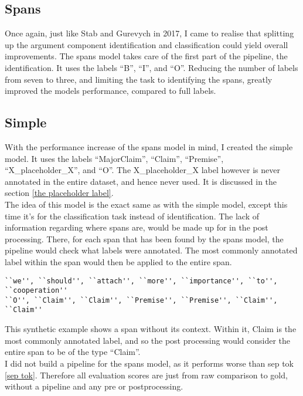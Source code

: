 \documentclass[12]{article}
\theoremstyle{mytheoremstyle}
\theoremstyle{mytheoremstyle}
\theoremstyle{myproblemstyle}
\begin{document}
  \subsection{Spans} \label{spans}
  Once again, just like Stab and Gurevych in 2017, I came to realise that splitting up the argument component identification and classification could yield overall improvements. The spans model takes care of the first part of the pipeline, the identification. It uses the labels ``B'', ``I'', and ``O''. Reducing the number of labels from seven to three, and limiting the task to identifying the spans, greatly improved the models performance, compared to full labels.
  \subsection{Simple} \label{simple}
  With the performance increase of the spans model in mind, I created the simple model. It uses the labels ``MajorClaim'', ``Claim'', ``Premise'', ``X\_placeholder\_X'', and ``O''. The X\_placeholder\_X label however is never annotated in the entire dataset, and hence never used. It is discussed in the section \ref{the placeholder label}.\\
 The idea of this model is the exact same as with the simple model, except this time it's for the classification task instead of identification. The lack of information regarding where spans are, would be made up for in the post processing. There, for each span that has been found by the spans model, the pipeline would check what labels were annotated. The most commonly annotated label within the span would then be applied to the entire span.  
  \begin{verbatim}
``we'', ``should'', ``attach'', ``more'', ``importance'', ``to'', ``cooperation''
``O'', ``Claim'', ``Claim'', ``Premise'', ``Premise'', ``Claim'', ``Claim''
  \end{verbatim}
  \vspace{-3.5ex}
  This synthetic example shows a span without its context. Within it, Claim is the most commonly annotated label, and so the post processing would consider the entire span to be of the type ``Claim''.\\ 
  I did not build a pipeline for the spans model, as it performs worse than sep tok \ref{sep tok}. 
  Therefore all evaluation scores are just from raw comparison to gold, without a pipeline and any pre or postprocessing.
\end{document}
